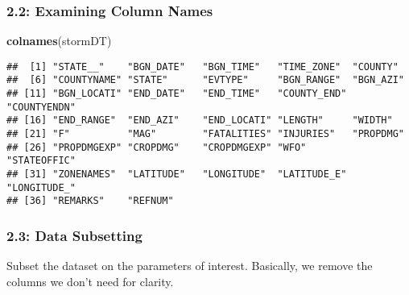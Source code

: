 \documentclass[
]{article}
\newenvironment{Shaded}{\begin{snugshade}}{\end{snugshade}}
\newcommand{\KeywordTok}[1]{\textcolor[rgb]{0.13,0.29,0.53}{\textbf{#1}}}
\newcommand{\NormalTok}[1]{#1}
\begin{document}
\hypertarget{examining-column-names}{%
\subsubsection{2.2: Examining Column
Names}\label{examining-column-names}}

\begin{Shaded}
\begin{Highlighting}[]
\KeywordTok{colnames}\NormalTok{(stormDT)}
\end{Highlighting}
\end{Shaded}

\begin{verbatim}
##  [1] "STATE__"    "BGN_DATE"   "BGN_TIME"   "TIME_ZONE"  "COUNTY"    
##  [6] "COUNTYNAME" "STATE"      "EVTYPE"     "BGN_RANGE"  "BGN_AZI"   
## [11] "BGN_LOCATI" "END_DATE"   "END_TIME"   "COUNTY_END" "COUNTYENDN"
## [16] "END_RANGE"  "END_AZI"    "END_LOCATI" "LENGTH"     "WIDTH"     
## [21] "F"          "MAG"        "FATALITIES" "INJURIES"   "PROPDMG"   
## [26] "PROPDMGEXP" "CROPDMG"    "CROPDMGEXP" "WFO"        "STATEOFFIC"
## [31] "ZONENAMES"  "LATITUDE"   "LONGITUDE"  "LATITUDE_E" "LONGITUDE_"
## [36] "REMARKS"    "REFNUM"
\end{verbatim}

\hypertarget{data-subsetting}{%
\subsubsection{2.3: Data Subsetting}\label{data-subsetting}}

Subset the dataset on the parameters of interest. Basically, we remove
the columns we don't need for clarity.
\end{document}
